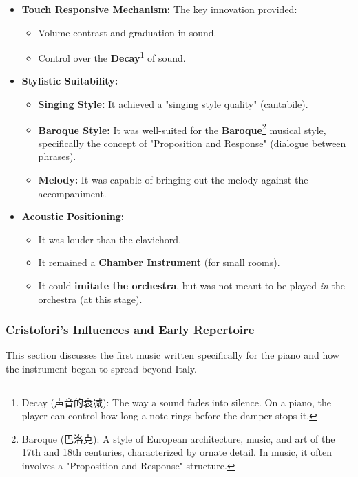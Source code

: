 \documentclass[math,code]{amznotes}
\theoremstyle{remark}
\begin{document}
\begin{itemize}
    \item \textbf{Touch Responsive Mechanism:} The key innovation provided:
    \begin{itemize}
        \item Volume contrast and graduation in sound.
        \item Control over the \textbf{Decay}\footnote{Decay (声音的衰减): The way a sound fades into silence. On a piano, the player can control how long a note rings before the damper stops it.} of sound.
    \end{itemize}
    \item \textbf{Stylistic Suitability:}
    \begin{itemize}
        \item \textbf{Singing Style:} It achieved a "singing style quality" (cantabile).
        \item \textbf{Baroque Style:} It was well-suited for the \textbf{Baroque}\footnote{Baroque (巴洛克): A style of European architecture, music, and art of the 17th and 18th centuries, characterized by ornate detail. In music, it often involves a "Proposition and Response" structure.} musical style, specifically the concept of "Proposition and Response" (dialogue between phrases).
        \item \textbf{Melody:} It was capable of bringing out the melody against the accompaniment.
    \end{itemize}
    \item \textbf{Acoustic Positioning:}
    \begin{itemize}
        \item It was louder than the clavichord.
        \item It remained a \textbf{Chamber Instrument} (for small rooms).
        \item It could \textbf{imitate the orchestra}, but was not meant to be played \textit{in} the orchestra (at this stage).
    \end{itemize}
\end{itemize}

\subsubsection{Cristofori's Influences and Early Repertoire}

This section discusses the first music written specifically for the piano and how the instrument began to spread beyond Italy.
\end{document}
